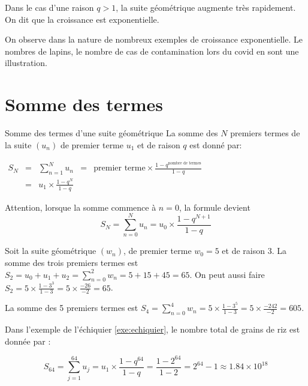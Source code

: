 \documentclass[10pt,a4paper,openany,twoside]{book}
\begin{document}
\begin{defi}{}{}
	Dans le cas d'une raison $q>1$, la suite géométrique augmente très rapidement. On dit que la croissance est exponentielle.
\end{defi}

\begin{rem}{}{}
  On observe dans la nature de nombreux exemples de croissance exponentielle. Le nombres de lapins, le nombre de cas de contamination lors du covid en sont une illustration.
\end{rem}

\section{Somme des termes}

\begin{theo}{Somme des termes d'une suite géométrique}{}
La somme des $N$ premiers termes de la suite $(u_n)$ de premier terme $u_1$ et de raison $q$ est donné par:


$\begin{aligned}
	S_N
	&=& \sum_{n=1}^{N} u_n
	&=& \text{premier terme} \times \frac{1-q^{\text{nombre de termes}}}{1-q}\\
	&=& u_1 \times \frac{1-q^N}{1-q}
\end{aligned}$

\end{theo}

\begin{rem}{}{}
	Attention, lorsque la somme commence à $n=0$, la formule devient $$S_N = \sum_{n=0}^{N} u_n = u_0 \times \frac{1-q^{N+1}}{1-q} $$
\end{rem}

\begin{ex}{}{}
	Soit la suite géométrique $(w_n)$, de premier terme $w_0=5$ et de raison $3$.
	La somme des trois premiers termes est $S_2 = u_0 + u_1 + u_2 = \sum_{n=0}^{2} w_n = 5 + 15 + 45 = 65$.
	On peut aussi faire $S_2 = 5 \times \frac{1-3^3}{1-3} = 5 \times \frac{-26}{-2} = 65$.

	La somme des 5 premiers termes est $S_{4} =\sum_{n=0}^{4} w_n= 5 \times \frac{1-3^5}{1-3} = 5 \times \frac{-242}{-2} = 605$.
\end{ex}

\begin{ex}{}{}
  Dans l'exemple de l'échiquier \ref{exe:echiquier}, le nombre total de grains de riz est donnée par :

  $$S_{64} = \sum_{j=1}^{64} u_j = u_1\times\frac{1-q^{64}}{1-q} = \frac{1-2^{64}}{1-2} = 2^{64}-1\approx 1.84 \times 10^{18}$$
\end{ex}
\end{document}

